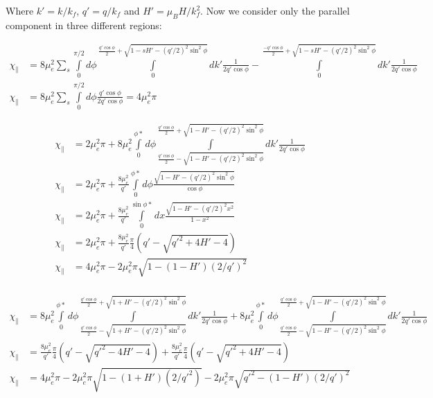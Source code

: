 \documentclass{article}
\begin{document}
 Where $k'=k/k_f$, $q'=q/k_f$ and $H'=\mu_B H/k_f^2$. Now we consider only the parallel component in three different regions:
 
 \begin{align*}
\chi_\parallel&=8\mu_e^2\sum\limits_s \int\limits_0^{\pi/2} d\phi \int\limits_0^{\frac{q'\cos\phi}{2} + \sqrt{1-sH'-(q'/2)^2\sin^2\phi}}dk'  \frac{ 1}{ 2q'\cos\phi}-\int\limits_0^{\frac{-q'\cos\phi}{2} + \sqrt{1-sH'-(q'/2)^2\sin^2\phi}} dk'  \frac{ 1}{ 2q'\cos\phi} \\
\chi_\parallel&=8\mu_e^2\sum\limits_s \int\limits_0^{\pi/2} d\phi \frac{ q'\cos\phi}{ 2q'\cos\phi} =4\mu_e^2\pi
 \end{align*}
 
 \begin{align*}
\chi_\parallel&=2\mu_e^2\pi +8\mu_e^2\int\limits_0^{\phi*} d\phi \int\limits_{\frac{q'\cos\phi}{2} - \sqrt{1-H'-(q'/2)^2\sin^2\phi}}^{\frac{q'\cos\phi}{2} + \sqrt{1-H'-(q'/2)^2\sin^2\phi}}dk'  \frac{ 1}{ 2q'\cos\phi} \\
\chi_\parallel&=2\mu_e^2\pi +\frac{8\mu_e^2}{q'}\int\limits_0^{\phi*} d\phi  \frac{ \sqrt{1-H'-(q'/2)^2\sin^2\phi}}{ \cos\phi} \\
\chi_\parallel&=2\mu_e^2\pi +\frac{8\mu_e^2}{q'}\int\limits_0^{\sin\phi*} dx  \frac{ \sqrt{1-H'-(q'/2)^2 x^2}}{ 1-x^2}  \\
\chi_\parallel&=2\mu_e^2\pi +\frac{8\mu_e^2}{q'}\frac{\pi}{4}(q'-\sqrt{q'^2+4H'-4} ) \\
\chi_\parallel&=4\mu_e^2\pi -2\mu_e^2\pi  \sqrt{1-(1-H')(2/q')^2}  \\
 \end{align*}
 
 
   \begin{align*}
\chi_\parallel&=8\mu_e^2\int\limits_0^{\phi*} d\phi \int\limits_{\frac{q'\cos\phi}{2} - \sqrt{1+H'-(q'/2)^2\sin^2\phi}}^{\frac{q'\cos\phi}{2} + \sqrt{1+H'-(q'/2)^2\sin^2\phi}}dk'  \frac{ 1}{ 2q'\cos\phi}  +8\mu_e^2\int\limits_0^{\phi*} d\phi \int\limits_{\frac{q'\cos\phi}{2} - \sqrt{1-H'-(q'/2)^2\sin^2\phi}}^{\frac{q'\cos\phi}{2} + \sqrt{1-H'-(q'/2)^2\sin^2\phi}}dk'  \frac{ 1}{ 2q'\cos\phi} \\
\chi_\parallel&=\frac{8\mu_e^2}{q'}\frac{\pi}{4}(q'-\sqrt{q'^2-4H'-4} )+\frac{8\mu_e^2}{q'}\frac{\pi}{4}(q'-\sqrt{q'^2+4H'-4} ) \\
\chi_\parallel&=4\mu_e^2\pi - 2\mu_e^2\pi \sqrt{1-(1+H')(2/q'^2)} -2\mu_e^2\pi \sqrt{q'^2-(1-H')(2/q')^2}  
 \end{align*}
  
\end{document}
